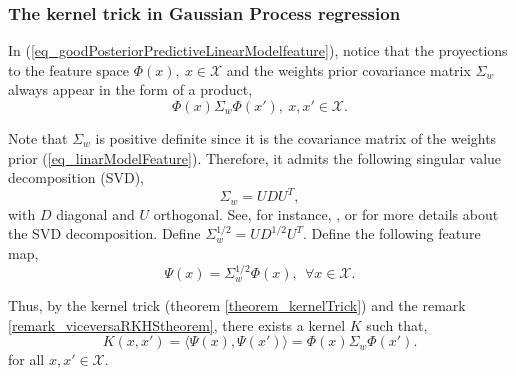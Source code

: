 \subsubsection{The kernel trick in Gaussian Process regression}

In (\ref{eq_goodPosteriorPredictiveLinearModelfeature}), notice that the proyections to the feature space $\Phi(x), \ x \in \mathcal{X}$ and the weights prior covariance matrix $\Sigma_w$ always appear in the form of a product,
\begin{equation} \label{eq_innerProductKernelTrick}
  \Phi(x) \Sigma_w \Phi(x'), \ x,x' \in \mathcal{X}.
\end{equation}

Note that $\Sigma_w$ is positive definite since it is the covariance matrix of the weights prior (\ref{eq_linarModelFeature}). Therefore, it admits the following singular value decomposition (SVD),
\begin{equation*}
  \Sigma_w = UDU^T,
\end{equation*}
with $D$ diagonal and $U$ orthogonal. See, for instance, \textcite{golub2013}, \textcite{demmel1997} or \textcite{trefethen1997} for more details about the SVD decomposition. Define $\Sigma_w^{1/2} = UD^{1/2}U^T$. Define the following feature map,
\begin{equation*}
  \Psi(x) = \Sigma_w^{1/2} \Phi(x), \ \ \forall x \in \mathcal{X}.
\end{equation*} 

Thus, by the kernel trick (theorem \ref{theorem_kernelTrick}) and the remark \ref{remark_viceversaRKHStheorem}, there exists a kernel $K$ such that,
\begin{equation} \label{eq_kernelTrickGP}
  K(x,x') = \langle \Psi(x) , \Psi(x') \rangle = \Phi(x) \Sigma_w \Phi(x').
\end{equation}
for all $x,x' \in \mathcal{X}$. 

